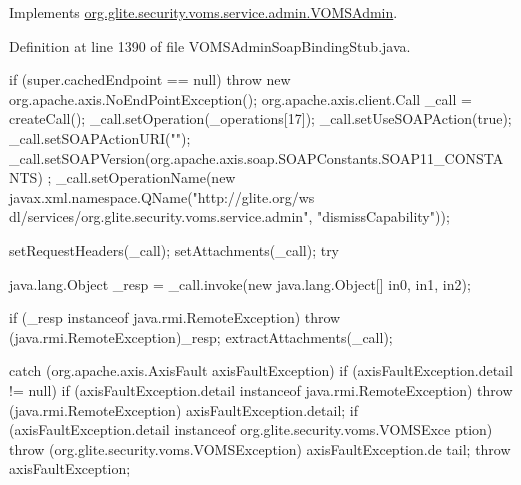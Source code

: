 \label{classorg_1_1glite_1_1security_1_1voms_1_1service_1_1admin_1_1VOMSAdminSoapBindingStub_a6ffc6d35ae8c59b0acfe803173e6f1ca}


Implements \hyperlink{interfaceorg_1_1glite_1_1security_1_1voms_1_1service_1_1admin_1_1VOMSAdmin_aa90fd4a29ffb1daae1cbc73d2eced653}{org.glite.security.voms.service.admin.VOMSAdmin}.



Definition at line 1390 of file VOMSAdminSoapBindingStub.java.


\begin{DoxyCode}
                                                                                 
                                                                                       
               {
        if (super.cachedEndpoint == null) {
            throw new org.apache.axis.NoEndPointException();
        }
        org.apache.axis.client.Call _call = createCall();
        _call.setOperation(_operations[17]);
        _call.setUseSOAPAction(true);
        _call.setSOAPActionURI("");
        _call.setSOAPVersion(org.apache.axis.soap.SOAPConstants.SOAP11_CONSTANTS)
      ;
        _call.setOperationName(new javax.xml.namespace.QName("http://glite.org/ws
      dl/services/org.glite.security.voms.service.admin", "dismissCapability"));

        setRequestHeaders(_call);
        setAttachments(_call);
 try {        java.lang.Object _resp = _call.invoke(new java.lang.Object[] {in0, 
      in1, in2});

        if (_resp instanceof java.rmi.RemoteException) {
            throw (java.rmi.RemoteException)_resp;
        }
        extractAttachments(_call);
  } catch (org.apache.axis.AxisFault axisFaultException) {
    if (axisFaultException.detail != null) {
        if (axisFaultException.detail instanceof java.rmi.RemoteException) {
              throw (java.rmi.RemoteException) axisFaultException.detail;
         }
        if (axisFaultException.detail instanceof org.glite.security.voms.VOMSExce
      ption) {
              throw (org.glite.security.voms.VOMSException) axisFaultException.de
      tail;
         }
   }
  throw axisFaultException;
}
    }
\end{DoxyCode}
